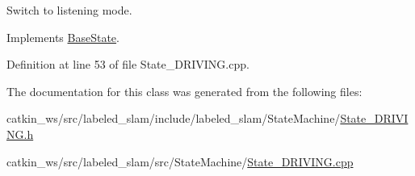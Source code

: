 Switch to listening mode. 



Implements \hyperlink{class_base_state_ac65db46601f60cd025ff058dae117d7c}{Base\+State}.



Definition at line 53 of file State\+\_\+\+D\+R\+I\+V\+I\+N\+G.\+cpp.



The documentation for this class was generated from the following files\+:\begin{DoxyCompactItemize}
\item 
catkin\+\_\+ws/src/labeled\+\_\+slam/include/labeled\+\_\+slam/\+State\+Machine/\hyperlink{_state___d_r_i_v_i_n_g_8h}{State\+\_\+\+D\+R\+I\+V\+I\+N\+G.\+h}\item 
catkin\+\_\+ws/src/labeled\+\_\+slam/src/\+State\+Machine/\hyperlink{_state___d_r_i_v_i_n_g_8cpp}{State\+\_\+\+D\+R\+I\+V\+I\+N\+G.\+cpp}\end{DoxyCompactItemize}
